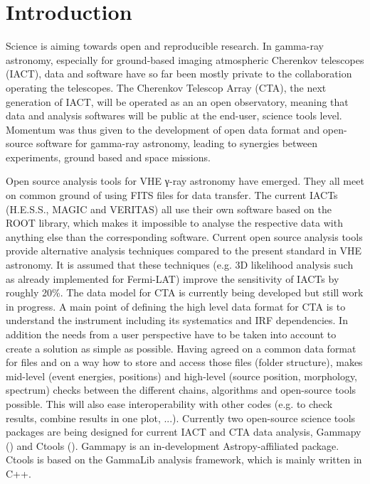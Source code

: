 \section{Introduction}

Science is aiming towards open and reproducible research. In gamma-ray astronomy, especially for ground-based imaging atmospheric Cherenkov telescopes (IACT), data and software have so far been mostly private to the collaboration operating the telescopes. The Cherenkov Telescop Array (CTA), the next generation of IACT, will be operated as an an open observatory, meaning that data and analysis softwares will be public at the end-user, science tools level. Momentum was thus given to the development of open data format and open-source software for gamma-ray astronomy, leading to synergies between experiments, ground based and space missions. 

Open source analysis tools for VHE γ-ray astronomy have emerged. They all meet on common ground of using FITS files for data transfer. The current IACTs (H.E.S.S., MAGIC and VERITAS) all use their own software based on the ROOT library, which makes it impossible to analyse the respective data with anything else than the corresponding software. Current open source analysis tools provide alternative analysis techniques compared to the present standard in VHE astronomy. It is assumed that these techniques (e.g. 3D likelihood analysis such as already implemented for Fermi-LAT) improve the sensitivity of IACTs by roughly 20\%. The data model for CTA is currently being developed but still work in progress. A main point of defining the high level data format for CTA is to understand the instrument including its systematics and IRF dependencies. In addition the needs from a user perspective have to be taken into account to create a solution as simple as possible. Having agreed on a common data format for files and on a way how to store and access those files (folder structure), makes mid-level (event energies, positions) and high-level (source position, morphology, spectrum) checks between the different chains, algorithms and open-source tools possible. This will also ease interoperability with other codes (e.g. to check results, combine results in one plot, ...). Currently two open-source science tools packages are being designed for current IACT and CTA data analysis, Gammapy (\cite{2015arXiv150907408D}) and Ctools (\citep{2016arXiv160600393K}). Gammapy is an in-development Astropy-affiliated package. Ctools is based on the GammaLib analysis framework, which is mainly written in C++.

